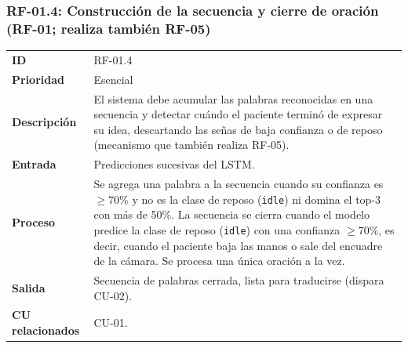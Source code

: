 \subsubsection{RF-01.4: Construcción de la secuencia y cierre de oración (RF-01; realiza también RF-05)}
\begin{table}[H]
\centering
\begin{tabularx}{\textwidth}{l X}
\toprule
\textbf{ID} & RF-01.4 \\
\textbf{Prioridad} & Esencial \\
\textbf{Descripción} & El sistema debe acumular las palabras reconocidas en una secuencia y detectar cuándo el paciente terminó de expresar su idea, descartando las señas de baja confianza o de reposo (mecanismo que también realiza RF-05). \\
\textbf{Entrada} & Predicciones sucesivas del LSTM. \\
\textbf{Proceso} & Se agrega una palabra a la secuencia cuando su confianza es $\geq$70\% y no es la clase de reposo (\texttt{idle}) ni domina el top-3 con más de 50\%. La secuencia se cierra cuando el modelo predice la clase de reposo (\texttt{idle}) con una confianza $\geq$70\%, es decir, cuando el paciente baja las manos o sale del encuadre de la cámara. Se procesa una única oración a la vez. \\
\textbf{Salida} & Secuencia de palabras cerrada, lista para traducirse (dispara CU-02). \\
\textbf{CU relacionados} & CU-01. \\
\bottomrule
\end{tabularx}
\end{table}

